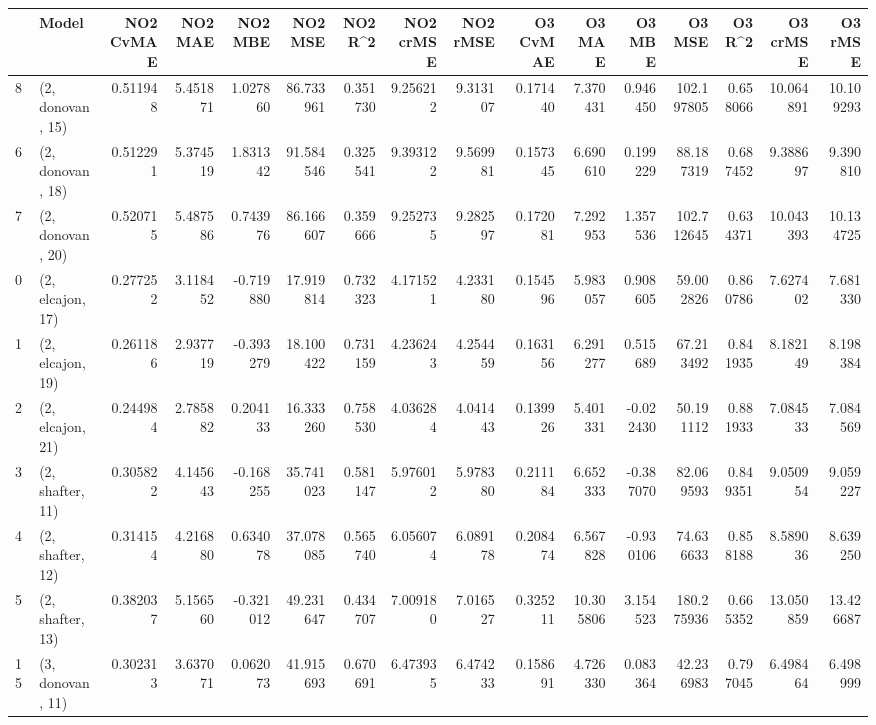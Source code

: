 \begin{tabular}{llrrrrrrrrrrrrrr}
\toprule
{} &             Model &  NO2 CvMAE &   NO2 MAE &   NO2 MBE &    NO2 MSE &   NO2 R\textasciicircum2 &  NO2 crMSE &  NO2 rMSE &  O3 CvMAE &     O3 MAE &    O3 MBE &      O3 MSE &    O3 R\textasciicircum2 &   O3 crMSE &    O3 rMSE \\
\midrule
8  &  (2, donovan, 15) &   0.511948 &  5.451871 &  1.027860 &  86.733961 &  0.351730 &   9.256212 &  9.313107 &  0.171440 &   7.370431 &  0.946450 &  102.197805 &  0.658066 &  10.064891 &  10.109293 \\
6  &  (2, donovan, 18) &   0.512291 &  5.374519 &  1.831342 &  91.584546 &  0.325541 &   9.393122 &  9.569981 &  0.157345 &   6.690610 &  0.199229 &   88.187319 &  0.687452 &   9.388697 &   9.390810 \\
7  &  (2, donovan, 20) &   0.520715 &  5.487586 &  0.743976 &  86.166607 &  0.359666 &   9.252735 &  9.282597 &  0.172081 &   7.292953 &  1.357536 &  102.712645 &  0.634371 &  10.043393 &  10.134725 \\
0  &  (2, elcajon, 17) &   0.277252 &  3.118452 & -0.719880 &  17.919814 &  0.732323 &   4.171521 &  4.233180 &  0.154596 &   5.983057 &  0.908605 &   59.002826 &  0.860786 &   7.627402 &   7.681330 \\
1  &  (2, elcajon, 19) &   0.261186 &  2.937719 & -0.393279 &  18.100422 &  0.731159 &   4.236243 &  4.254459 &  0.163156 &   6.291277 &  0.515689 &   67.213492 &  0.841935 &   8.182149 &   8.198384 \\
2  &  (2, elcajon, 21) &   0.244984 &  2.785882 &  0.204133 &  16.333260 &  0.758530 &   4.036284 &  4.041443 &  0.139926 &   5.401331 & -0.022430 &   50.191112 &  0.881933 &   7.084533 &   7.084569 \\
3  &  (2, shafter, 11) &   0.305822 &  4.145643 & -0.168255 &  35.741023 &  0.581147 &   5.976012 &  5.978380 &  0.211184 &   6.652333 & -0.387070 &   82.069593 &  0.849351 &   9.050954 &   9.059227 \\
4  &  (2, shafter, 12) &   0.314154 &  4.216880 &  0.634078 &  37.078085 &  0.565740 &   6.056074 &  6.089178 &  0.208474 &   6.567828 & -0.930106 &   74.636633 &  0.858188 &   8.589036 &   8.639250 \\
5  &  (2, shafter, 13) &   0.382037 &  5.156560 & -0.321012 &  49.231647 &  0.434707 &   7.009180 &  7.016527 &  0.325211 &  10.305806 &  3.154523 &  180.275936 &  0.665352 &  13.050859 &  13.426687 \\
15 &  (3, donovan, 11) &   0.302313 &  3.637071 &  0.062073 &  41.915693 &  0.670691 &   6.473935 &  6.474233 &  0.158691 &   4.726330 &  0.083364 &   42.236983 &  0.797045 &   6.498464 &   6.498999 \\

\end{tabular}
